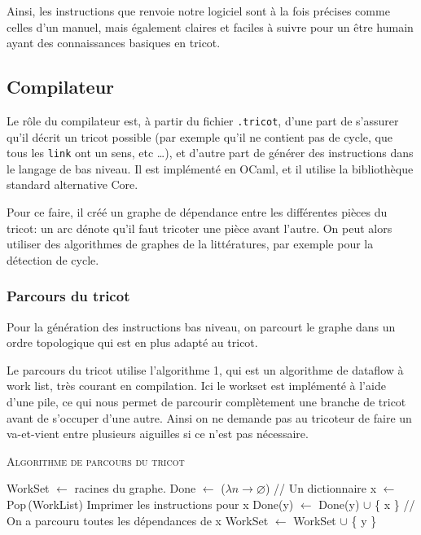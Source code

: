 \documentclass{article}
\begin{document}

Ainsi, les instructions que renvoie notre logiciel sont à la fois précises comme celles d'un manuel, mais 
également claires et faciles à suivre pour un être humain ayant des connaissances basiques en tricot. 

\subsection{Compilateur} %

Le rôle du compilateur est, à partir du fichier \texttt{.tricot}, d'une part de 
s'assurer qu'il décrit un tricot possible (par exemple qu'il ne contient
pas de cycle, que tous les \texttt{link} ont un sens, etc \dots), et 
d'autre part de générer des instructions  dans le langage de bas niveau.
Il est implémenté en OCaml, et il utilise la bibliothèque standard alternative
Core. 

Pour ce faire, il créé un graphe de dépendance entre les différentes pièces
du tricot: un arc dénote qu'il faut tricoter une pièce avant l'autre. On peut
alors utiliser des algorithmes de graphes de la littératures, par exemple pour 
la détection de cycle.

\subsubsection{Parcours du tricot}

Pour la génération des instructions bas niveau, on parcourt le graphe 
dans un ordre topologique qui est en plus adapté au tricot.

Le parcours du tricot utilise l'algorithme 1, qui est un algorithme de
dataflow à work list, très courant en compilation. Ici le workset est
implémenté à l'aide d'une pile, ce qui nous permet de parcourir
complètement une branche de tricot avant de s'occuper d'une
autre. Ainsi on ne demande pas au tricoteur de faire un va-et-vient
entre plusieurs aiguilles si ce n'est pas nécessaire.

\begin{algorithm}\label{algo}
\caption{\textsc{Algorithme de parcours du tricot}}
\begin{algorithmic}[1]
\State WorkSet $\leftarrow$ racines du graphe.
\State Done $\leftarrow$ ($\lambda n \to \varnothing$) // Un dictionnaire
  \State x $\leftarrow$ Pop\,(WorkList)
  \State Imprimer les instructions pour x
    \State Done(y) $\leftarrow$ Done(y) $\cup$ \{ x \}
     // On a parcouru toutes les dépendances de x
      \State WorkSet $\leftarrow$ WorkSet $\cup$ \{ y \}
    \EndIf
  \EndFor
\EndWhile
\end{algorithmic}
\end{algorithm}
\end{document}
